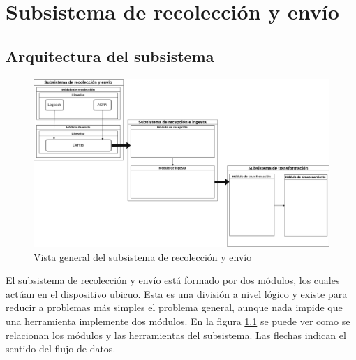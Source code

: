 \chapter{Subsistema de recolección y envío}

\section{Arquitectura del subsistema}

\begin{figure}[!htb]
	\includegraphics[width=\linewidth]{Moduloss-subrecenv.png}
	\caption{Vista general del subsistema de recolección y envío}
	\label{fig:subrecenv}
\end{figure}

El subsistema de recolección y envío está formado por dos módulos, los cuales actúan en el dispositivo ubicuo. Esta es una división a nivel lógico y existe para reducir a problemas más simples el problema general, aunque nada impide que una herramienta implemente dos módulos. En la figura \ref{fig:subrecenv} se puede ver como se relacionan los módulos y las herramientas del subsistema. Las flechas indican el sentido del flujo de datos.

